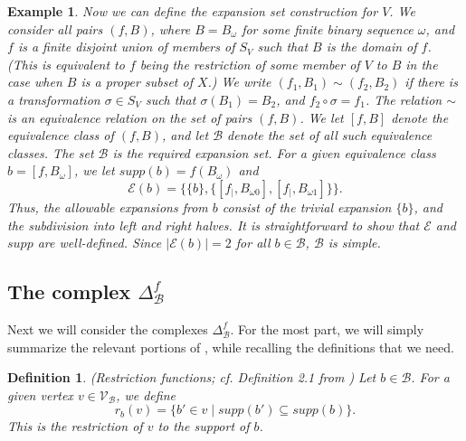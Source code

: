 \documentclass{amsart}
\newtheorem{Definition}[theorem]{Definition}
\newtheorem{Example}[theorem]{Example}
\newtheorem{Remark}[theorem]{Remark}
\newtheorem{standing assumption}[theorem]{Standing Assumption}
\newenvironment{definition}{\begin{Definition}\normalfont}{\end{Definition}}
\newenvironment{example}{\begin{Example}\normalfont}{\end{Example}}
\newenvironment{remark}{\begin{Remark}\normalfont}{\end{Remark}}
\begin{document}
\begin{example}
Now we can define the expansion set construction for $V$. We consider all pairs $(f,B)$, where
$B = B_{\omega}$ for some finite binary sequence $\omega$, and $f$ is a finite disjoint union of 
members of $S_{V}$ such that $B$ is the domain of $f$. (This is equivalent to $f$ being the restriction of some member of $V$ to $B$ in the case when $B$ is a proper subset of $X$.) We write $(f_{1},B_{1}) \sim (f_{2},B_{2})$ if there is a transformation
$\sigma \in S_{V}$ such that $\sigma(B_{1}) = B_{2}$, and $f_{2} \circ \sigma = f_{1}$. The relation
$\sim$ is an equivalence relation on the set of pairs $(f,B)$. We let $[f,B]$ denote the equivalence class of $(f,B)$, and let $\mathcal{B}$ denote the set of all such equivalence classes. The set $\mathcal{B}$ is the required expansion set. For a given equivalence class $b=[f,B_{\omega}]$, we let $supp(b) = f(B_{\omega})$ and 
\[ \mathcal{E}(b) = \{ \{ b \}, \{ [f_{\mid}, B_{\omega0}], [f_{\mid}, B_{\omega1}] \} \}. \]
Thus, the allowable expansions from $b$ consist of the trivial expansion $\{ b \}$, and the subdivision 
into left and right halves. It is straightforward to show that $\mathcal{E}$ and $supp$ are well-defined. Since $|\mathcal{E}(b)| = 2$ for all $b \in \mathcal{B}$, $\mathcal{B}$ is simple. 
\end{example}

\subsection{The complex $\Delta^{f}_{\mathcal{B}}$}

Next we will consider the complexes $\Delta^{f}_{\mathcal{B}}$. For the most part, we will simply summarize the relevant portions of \cite{Farley}, while recalling the definitions that we need.

\begin{definition} \label{definition:restriction} (Restriction functions; cf. Definition 2.1 from \cite{Farley})
Let $b \in \mathcal{B}$. For a given vertex $v \in \mathcal{V}_{\mathcal{B}}$, we define
\[ r_{b}(v) = \{ b' \in v \mid supp(b') \subseteq supp(b) \}. \]
This is the \emph{restriction of $v$ to the support of $b$}.
\end{definition}

\end{document}
